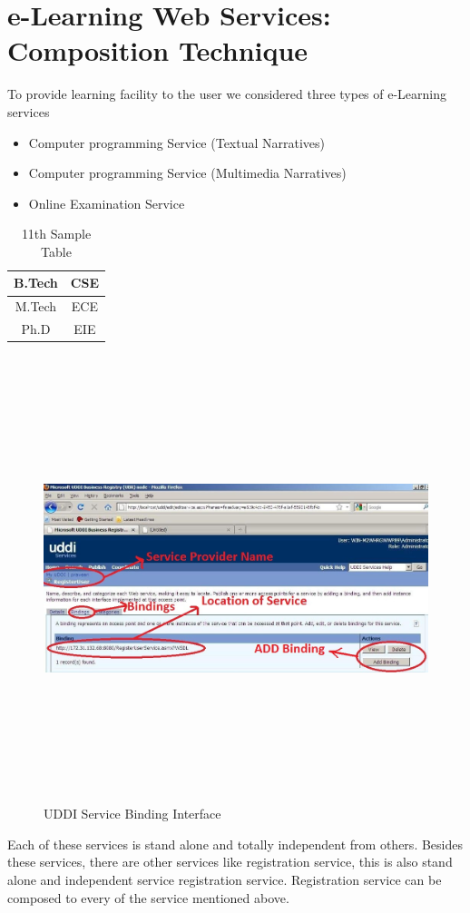 \section{e-Learning  Web  Services: Composition Technique}
To provide learning facility to the user we considered three types of e-Learning services
\begin{itemize}
\item Computer programming Service (Textual Narratives)
\item Computer programming Service (Multimedia Narratives)
\item Online Examination Service

\end{itemize}

\begin{table}
 \begin{center}
 \caption{11th Sample Table}
 \begin{tabular}{|c|c|}
 \hline
 B.Tech & CSE\\
 \hline
 M.Tech & ECE\\
 \hline
 Ph.D & EIE\\
 \hline 
 \end{tabular}
 \end{center}
\end{table}
\begin{figure}[h!]
 \centering
 \includegraphics[width=16cm,height=13cm]{uddi_service_binding_interface.jpg}
 \caption{UDDI Service Binding Interface}
\end{figure}
Each of these services is stand alone and totally independent from others. Besides these services, there are other services 
like registration service, this is also stand alone and independent service registration service. Registration service can be composed to every of the service mentioned above. 



